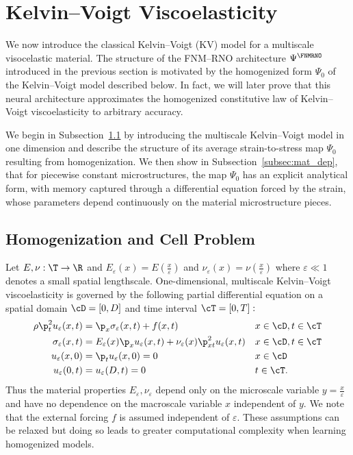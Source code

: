 \documentclass[letterpaper,11pt]{article}
\begin{document}
\section{Kelvin--Voigt Viscoelasticity}\label{sec:PB}
We now introduce the classical Kelvin--Voigt (KV) model for a multiscale visocelastic material. The structure of the FNM--RNO architecture $\Psi^{\FNMRNO}$ introduced in the previous section is motivated by the homogenized form $\Psi_0$ of the Kelvin--Voigt model described below. In fact, we will later prove that this neural architecture approximates the homogenized constitutive law of Kelvin--Voigt viscoelasticity to arbitrary accuracy.

We begin in Subsection~\ref{subsec:KV_homog} by introducing the multiscale Kelvin--Voigt model in one dimension and describe the structure of its average strain-to-stress map $\Psi_0$ resulting from homogenization. We then show in Subsection~\ref{subsec:mat_dep}, that for piecewise constant microstructures, the map $\Psi_0$ has an explicit analytical form, with memory captured through a differential equation forced by the strain, whose parameters depend continuously on the material microstructure pieces.

\subsection{Homogenization and Cell Problem}\label{subsec:KV_homog}
Let $E, \nu: \T \to \R$ and $E_{\varepsilon}(x) = E(\frac{x}{\varepsilon})$ and $\nu_{\varepsilon}(x) = \nu(\frac{x}{\varepsilon})$ where $\varepsilon \ll 1$ denotes a small spatial lengthscale. One-dimensional, multiscale Kelvin--Voigt viscoelasticity is governed by the following partial differential equation on a spatial domain $\cD = [0,D]$ and time interval $\cT = [0,T]:$
\begin{align}\label{PDE-eps}
    \rho \p_t^2 u_{\varepsilon}(x,t) & = \p_x \sigma_{\varepsilon}(x,t) + f(x,t) && x \in \cD, t \in \cT \\
    \sigma_{\varepsilon}(x,t)&= E_{\varepsilon}(x)\p_xu_{\varepsilon}(x,t) + \nu_{\varepsilon}(x)\p^2_{xt}u_{\varepsilon}(x,t) && x \in \cD, t\in \cT\\
    u_{\varepsilon}(x,0) &= \p_tu_{\varepsilon}(x,0)=0 && x \in \cD\\
    u_{\varepsilon}(0,t) &= u_{\varepsilon}(D, t) = 0 && t \in \cT.
\end{align}
Thus the material properties $E_{\varepsilon}, \nu_{\varepsilon}$ depend only on the microscale variable $y=\frac{x}{\varepsilon}$ and have no dependence on the macroscale variable $x$ independent of $y$. We note that the external forcing $f$ is assumed independent of $\varepsilon$. These assumptions can be relaxed but doing so leads to greater computational complexity when learning homogenized models.
\end{document}
